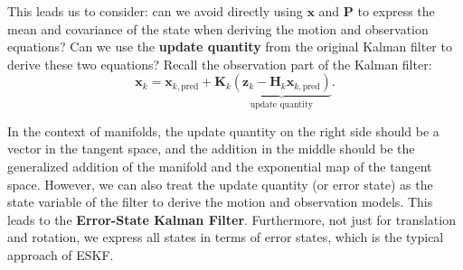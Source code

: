 This leads us to consider: can we avoid directly using $\bm{x}$ and $\bm{P}$ to express the mean and covariance of the state when deriving the motion and observation equations? Can we use the \textbf{update quantity} from the original Kalman filter to derive these two equations? Recall the observation part of the Kalman filter:
\begin{equation}\label{key}
	\bm{x}_k = \bm{x}_{k, \text{pred}} + \bm{K}_k \underbrace{(\bm{z}_k - \bm{H}_k \bm{x}_{k, \text{pred}})}_{\text{update quantity}}.
\end{equation}

In the context of manifolds, the update quantity on the right side should be a vector in the tangent space, and the addition in the middle should be the generalized addition of the manifold and the exponential map of the tangent space. However, we can also treat the update quantity (or error state) as the state variable of the filter to derive the motion and observation models. This leads to the \textbf{Error-State Kalman Filter}. Furthermore, not just for translation and rotation, we express all states in terms of error states, which is the typical approach of ESKF.

